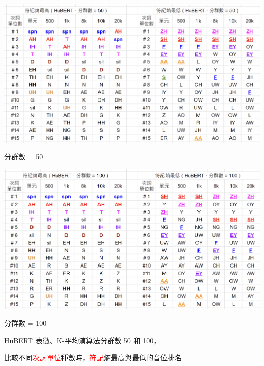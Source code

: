     {
        \begin{table}
            \centering
            \begin{subtable}{\textwidth}
                \centering
                \includegraphics[width=1\linewidth]{figures/ch4figs/phnrank-hub50pcs.png}
                \caption{分群數 = 50}
                \label{subtabfig:hub-u050-phnrank-hub50pcs}
            \end{subtable}
            \vfill
            \begin{subtable}{\textwidth}
                \centering
                \includegraphics[width=1\linewidth]{figures/ch4figs/phnrank-hub100pcs.png}
                \caption{分群數 = 100}
                \label{subtabfig:hub-u050-phnrank-hub100pcs}
            \end{subtable}
    
            \caption{HuBERT 表徵、K-平均演算法分群數 50 和 100，}
            比較不同\textcolor{red}{次詞單位}種數時，\textcolor{red}{符記}熵最高與最低的音位排名
            \label{tabfig:hub-u050-phnrank}
        \end{table}
    }

